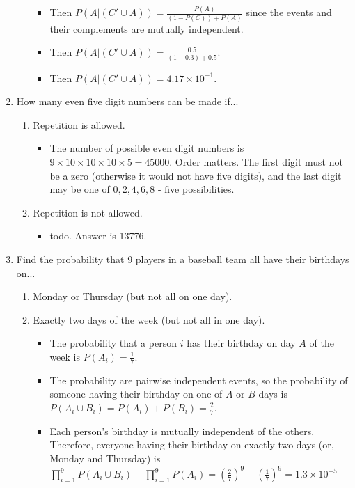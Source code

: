 \documentclass{article}
\begin{document}
\begin{enumerate}
\begin{enumerate}
\begin{itemize}
        \item Then $P(A | (C' \cup A)) = \frac{P(A)}{(1 - P(C)) + P(A)}$ since the events and their complements are mutually independent.
        \item Then $P(A | (C' \cup A)) = \frac{0.5}{(1 - 0.3) + 0.5}$.
        \item Then $P(A | (C' \cup A)) = 4.17 \times 10^{-1}$.
        \end{itemize}
    \end{enumerate}
\item How many even five digit numbers can be made if...
    \begin{enumerate}
    \item Repetition is allowed.
        \begin{itemize}
        \item The number of possible even digit numbers is $9 \times 10 \times 10 \times 10 \times 5 = 45000$. Order matters. The first digit must not be a zero (otherwise it would not have five digits), and the last digit may be one of $0, 2, 4, 6, 8$ - five possibilities.
        \end{itemize}
    \item Repetition is not allowed.
        \begin{itemize}
        \item todo. Answer is 13776.
        \end{itemize}
    \end{enumerate}
\item Find the probability that 9 players in a baseball team all have their birthdays on...
    \begin{enumerate}
    \item Monday or Thursday (but not all on one day).
    \item Exactly two days of the week (but not all in one day).
        \begin{itemize}
        \item The probability that a person $i$ has their birthday on day $A$ of the week is $P(A_i) = \frac{1}{7}$.
        \item The probability are pairwise independent events, so the probability of someone having their birthday on one of $A$ or $B$ days is $P(A_i \cup B_i) = P(A_i) + P(B_i) = \frac{2}{7}$.
        \item Each person's birthday is mutually independent of the others. Therefore, everyone having their birthday on exactly two days (or, Monday and Thursday) is $\prod\limits_{i=1}^9 P(A_i \cup B_i) - \prod\limits_{i=1}^9 P(A_i) = (\frac{2}{7})^9 - (\frac{1}{7})^9 = 1.3 \times 10^{-5}$

\end{itemize}
\end{enumerate}
\end{enumerate}
\end{document}
